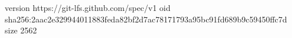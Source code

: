 version https://git-lfs.github.com/spec/v1
oid sha256:2aac2e329944011883feda82bf2d7ac78171793a95bc91fd689b9c59450ffc7d
size 2562
